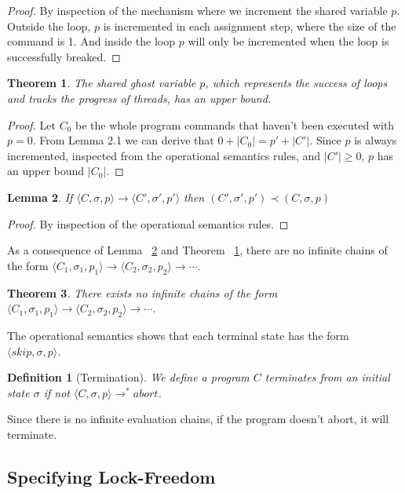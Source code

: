 \documentclass{article}
\newtheorem{defi}{Definition}
\newtheorem{theorem}{Theorem}[section]
\newtheorem{lemma}[theorem]{Lemma}
\begin{document}
\begin{proof}
By inspection of the mechanism where we increment the shared variable $p$. Outside the loop, $p$ is incremented in each assignment step, where the size of the command is 1. And inside the loop $p$ will only be incremented when the loop is successfully breaked.
\end{proof}

\begin{theorem}
\label{theo:p_bound}
The shared ghost variable $p$, which represents the success of loops and tracks the progress of threads, has an upper bound.
\end{theorem}
\begin{proof}
Let $C_0$ be the whole program commands that haven't been executed with $p = 0$. From Lemma 2.1 we can derive that $0 + |C_0| = p' + |C'|$. Since $p$ is always incremented, inspected from the operational semantics rules, and $|C'| \geq 0$, $p$ has an upper bound $|C_0|$.
\end{proof}

\begin{lemma}
\label{lemma:reduce}
If $\langle C, \sigma, p \rangle \to \langle C', \sigma', p' \rangle$ then $(C', \sigma', p') \prec (C, \sigma, p)$
\end{lemma}
\begin{proof}
By inspection of the operational semantics rules.
\end{proof}

As a consequence of Lemma ~\ref{lemma:reduce} and Theorem ~\ref{theo:p_bound}, there are no infinite chains of the form $\langle C_1, \sigma_1, p_1 \rangle \rightarrow \langle C_2, \sigma_2, p_2 \rangle \rightarrow \cdots$.

\begin{theorem}
There exists no infinite chains of the form $\langle C_1, \sigma_1, p_1 \rangle \rightarrow \langle C_2, \sigma_2, p_2 \rangle \rightarrow \cdots$.
\end{theorem}

The operational semantics shows that each terminal state has the form $\langle skip, \sigma, p \rangle$. 

\begin{defi}[Termination]
We define a program $C$ terminates from an initial state $\sigma$ if not $\langle C, \sigma, p \rangle \to^* abort$.
\end{defi}
Since there is no infinite evaluation chains, if the program doesn't abort, it will terminate.
\subsection{Specifying Lock-Freedom}
\end{document}
